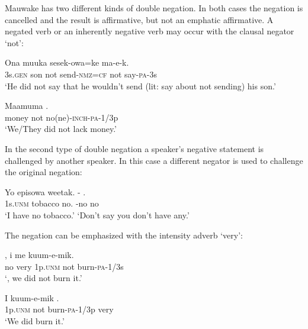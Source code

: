 Mauwake has two different kinds of double negation. In both cases the negation is cancelled and the result is affirmative, but not an emphatic affirmative. A negated verb or an inherently negative verb may occur with the clausal negator  `not':

\ea%
\label{ex:x1131}
\gll Ona  muuka    sesek-owa=ke    ma-e-k. \\
3s.\textsc{gen}  son  not  send-\textsc{nmz}=\textsc{cf}  not  say-\textsc{pa}-3s\\
\glt `He did not say that he wouldn't send (lit: say about not sending) his son.'
\z

\ea%
\label{ex:x1132}
\gll Maamuma    . \\
money  not  no(ne)-\textsc{inch}-\textsc{pa}-1/3p\\
\glt `We/They did not lack money.'
\z

In the second type of double negation a speaker's negative statement is challenged by another speaker. In this case a different negator is used to challenge the original negation: 

\ea%
\label{ex:x1133}
\gll Yo  episowa  weetak.  -  . \\
1s.\textsc{unm}  tobacco  no.  -no  no\\
\glt `I have no tobacco.'  `Don't say you don't have any.'
\z

The negation can be emphasized with the intensity adverb  `very':

\ea%
\label{ex:x1134}
\gll {}  ,  i  me  kuum-e-mik. \\
no  very  1p.\textsc{unm}  not  burn-\textsc{pa}-1/3s\\
\glt `, we did not burn it.'
\z

\ea%
\label{ex:x1135}
\gll I    kuum-e-mik  . \\
1p.\textsc{unm}  not  burn-\textsc{pa}-1/3p  very\\
\glt `We did  burn it.'
\z

